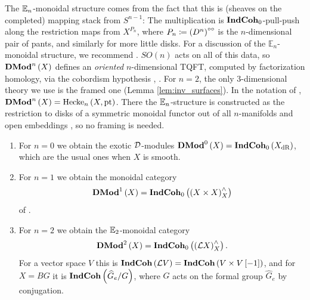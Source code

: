 The $\mathbb{E}_{n}$-monoidal structure comes from the fact that this is (sheaves on the
completed) mapping stack from $S^{n-1}$: The multiplication is $\mathbf{IndCoh}_0$-pull-push
along the restriction maps from $X^{P_n}$, where $P_n\coloneqq\left(D^n\right)^{\circ\circ}$
is the $n$-dimensional pair of pants, and similarly for more little disks.
For a discussion of the $\mathbb{E}_n$-monoidal structure, we recommend
\cite{Toen:branes}.
$SO\left(n\right)$ acts on all of this data, so $\mathbf{DMod}^n\left(X\right)$ defines an
\emph{oriented} $n$-dimensional TQFT, computed by factorization homology, via the cobordism
hypothesis \cite{L:Cob}, \cite[Section 3.2]{Ber:Sph}. For $n=2$, the only $3$-dimensional theory we
use is the framed one (Lemma \ref{lem:inv_surfaces}).
In the notation of \cite{HoLi}, $\mathbf{DMod}^n\left(X\right)=\mathrm{Hecke}_n\left(X,\text{pt}\right)$.
There the $\mathbb{E}_n$-structure is constructed as the restriction to disks of a symmetric monoidal
functor out of all $n$-manifolds and open embeddings \cite[Sections 3.1--3.2]{HoLi}, so no
framing is needed.

\begin{exm}
\label{exm:DMod_small_n}
\begin{enumerate}
\item For $n = 0$ we obtain the exotic $\mathcal{D}$-modules $\mathbf{DMod}^0\left(X\right) =
\mathbf{IndCoh}_0\left(X_{\text{dR}}\right)$, which are the usual ones when $X$ is smooth.
\item For $n = 1$ we obtain the monoidal category
\begin{equation*}
\mathbf{DMod}^1\left(X\right) = \mathbf{IndCoh}_0\left(\left(X\times X\right)^\wedge_X\right)
\end{equation*}
of \cite{Ber:center}.
\item For $n=2$ we obtain the $\mathbb{E}_2$-monoidal category
\begin{equation*}
\mathbf{DMod}^2\left(X\right) = \mathbf{IndCoh}_0\left(\left(\mathcal{L} X\right)^\wedge_X\right).
\end{equation*}
For a vector space $V$ this is $\mathbf{IndCoh}\left(\mathcal{L} V\right)
= \mathbf{IndCoh}\left(V\times V\left[-1\right]\right)$, and for $X = BG$ it is
$\mathbf{IndCoh}\left(\widehat{G}_e/G\right)$, where $G$ acts on the formal group $\widehat G_e$ by
conjugation.
\end{enumerate}
\end{exm}


